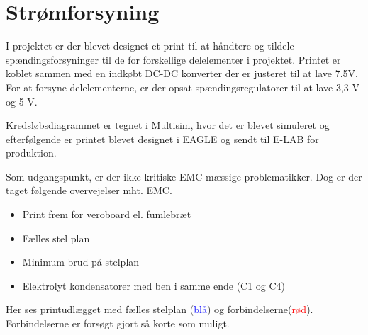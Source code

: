 \chapter{Strømforsyning}

I projektet er der blevet designet et print til at håndtere og tildele spændingsforsyninger til de for forskellige delelementer i projektet. Printet er koblet sammen med en indkøbt DC-DC konverter der er justeret til at lave 7.5V. For at forsyne delelementerne, er der opsat spændingsregulatorer til at lave 3,3 V og 5 V.

Kredsløbsdiagrammet er tegnet i Multisim, hvor det er blevet simuleret og efterfølgende er printet blevet designet i EAGLE og sendt til E-LAB for produktion.


Som udgangspunkt, er der ikke kritiske EMC mæssige problematikker. Dog er der taget følgende overvejelser mht. EMC.

\begin{itemize}
\item Print frem for veroboard el. fumlebræt
\item Fælles stel plan
\item Minimum brud på stelplan
\item Elektrolyt kondensatorer med ben i samme ende (C1 og C4)
\end{itemize}

\newpage 

Her ses printudlægget med fælles stelplan (\textcolor{blue}{blå}) og forbindelserne(\textcolor{red}{rød}). Forbindelserne er forsøgt gjort så korte som muligt.

